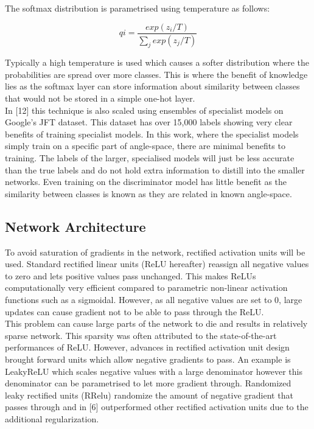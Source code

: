 \documentclass{article}
\begin{document}
The softmax distribution is parametrised using temperature as follows:

\[qi = \frac{exp(z_i/T)}{\sum_j exp(z_j/T)}\]

Typically a high temperature is used which causes a softer distribution where the probabilities are spread over more classes. This is where the benefit of knowledge lies as the softmax layer can store information about similarity between classes that would not be stored in a simple one-hot layer.\\

In [12] this technique is also scaled using ensembles of specialist models on Google's JFT dataset. This dataset has over 15,000 labels showing very clear benefits of training specialist models. In this work, where the specialist models simply train on a specific part of angle-space, there are minimal benefits to training. The labels of the larger, specialised models will just be less accurate than the true labels and do not hold extra information to distill into the smaller networks. Even training on the discriminator model has little benefit as the similarity between classes is known as they are related in known angle-space.

\subsection*{Network Architecture}
To avoid saturation of gradients in the network, rectified activation units will be used. Standard rectified linear units (ReLU hereafter) reassign all negative values to zero and lets positive values pass unchanged. This makes ReLUs computationally very efficient compared to parametric non-linear activation functions such as a sigmoidal. However, as all negative values are set to 0, large updates can cause gradient not to be able to pass through the ReLU.\\

This problem can cause large parts of the network to die and results in relatively sparse network. This sparsity was often attributed to the state-of-the-art performances of ReLU. However, advances in rectified activation unit design brought forward units which allow negative gradients to pass. An example is LeakyReLU which scales negative values with a large denominator however this denominator can be parametrised to let more gradient through. Randomized leaky rectified units (RRelu) randomize the amount of negative gradient that passes through and in [6] outperformed other rectified activation units due to the additional regularization.\\
\end{document}

